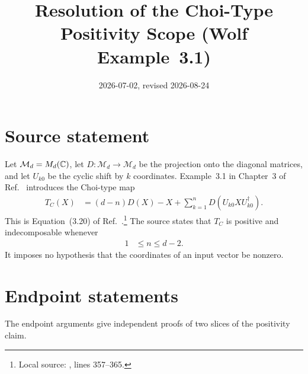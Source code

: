\documentclass{article}
\title{Resolution of the Choi-Type Positivity Scope (Wolf Example~3.1)}
\author{}
\date{2026-07-02, revised 2026-08-24}
\begin{document}
\maketitle
{}

\section{Source statement}

Let $\mathcal M_d=M_{d}(\mathbb{C})$, let
$D\colon\mathcal M_d\to\mathcal M_d$ be the projection onto the diagonal
matrices, and let $U_{k0}$ be the cyclic shift by $k$ coordinates.
Example~3.1 in Chapter~3 of Ref.~\cite{Wolf2012Quantum} introduces the
Choi-type map
\begin{align}
    T_C(X)
        &=(d-n)D(X)-X
          +\sum_{k=1}^{n}D(U_{k0}XU_{k0}^{\dagger}).
    \label{eq:wolf_ex3_1_choi_positivity_subcase_scope_choi_type_map}
\end{align}
This is Equation~(3.20) of Ref.~\cite{Wolf2012Quantum}.\footnote{Local source:
,
lines 357--365.}
The source states that $T_C$ is positive and indecomposable whenever
\begin{align}
    1
        &\leq n\leq d-2.
    \label{eq:wolf_ex3_1_choi_positivity_subcase_scope_source_parameter_range}
\end{align}
It imposes no hypothesis that the coordinates of an input vector be nonzero.

\section{Endpoint statements}

The endpoint arguments give independent proofs of two slices of the positivity
claim.
\end{document}
